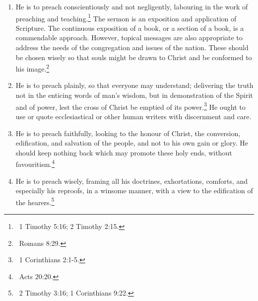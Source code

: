 \begin{outerlst}[left=0pt,labelsep=0pt]
\begin{innerlst}[resume*]
\begin{enumerate}[label=\alph*)]
            \item He is to preach conscientiously and not negligently, labouring in the work of preaching and teaching.\footnote{\ 1 Timothy 5:16; 2 Timothy 2:15.} The sermon is an exposition and application of Scripture. The continuous exposition of a book, or a section of a book, is a commendable approach. However, topical messages are also appropriate to address the needs of the congregation and issues of the nation. These should be chosen wisely so that souls might be drawn to Christ and be conformed to his image.\footnote{\ Romans 8:29.} 
            \item He is to preach plainly, so that everyone may understand; delivering the truth not in the enticing words of man's wisdom, but in demonstration of the Spirit and of power, lest the cross of Christ be emptied of its power.\footnote{\ 1 Corinthians 2:1-5.} He ought to use or quote ecclesiastical or other human writers with discernment and care. 
            \item He is to preach faithfully, looking to the honour of Christ, the conversion, edification, and salvation of the people, and not to his own gain or glory. He should keep nothing back which may promote these holy ends, without favouritism.\footnote{\ Acts 20:20.} 
            \item He is to preach wisely, framing all his doctrines, exhortations, comforts, and especially his reproofs, in a winsome manner, with a view to the edification of the hearers.\footnote{\ 2 Timothy 3:16; 1 Corinthians 9:22.} 

\end{enumerate}
\end{innerlst}
\end{outerlst}

